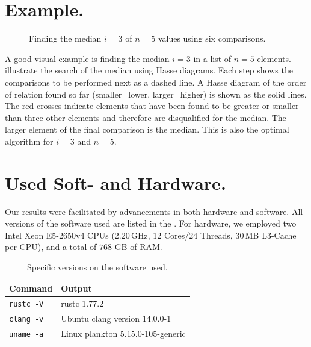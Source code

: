 \documentclass[twoside,leqno,twocolumn]{article}
\begin{document}
\section{Example.}
\begin{figure}[!b]
  \centering
  
  \caption{Finding the median $i = 3$ of $n = 5$ values using six comparisons.}
  \label{fig:median_of_5}
\end{figure}
A good visual example is finding the median $i = 3$ in a list of $n = 5$ elements.
 illustrate the search of the median using Hasse diagrams.
Each step shows the comparisons to be performed next as a dashed line.
A Hasse diagram of the order of relation found so far (smaller=lower, larger=higher) is shown as the solid lines.
The red crosses indicate elements that have been found to be greater or smaller than three other elements and therefore are disqualified for the median.
The larger element of the final comparison is the median.
This is also the optimal algorithm for $i = 3$ and $n = 5$.






\section{Used Soft- and Hardware.} \label{sec:hardware}

Our results were facilitated by advancements in both hardware and software.
All versions of the software used are listed in the .
For hardware, we employed two Intel Xeon E5-2650v4 CPUs (2.20\,GHz, 12 Cores/24 Threads, 30\,MB L3-Cache per CPU), and a total of $768$ GB of RAM.

\begin{table}[!t]
  \renewcommand{\arraystretch}{1.1}
  \caption{Specific versions on the software used.}
  \label{table:command_outputs}
  \centering
  \small
  \begin{tabular}{l|l}
    \textbf{Command}  & \textbf{Output}                   \\ \hline
    \texttt{rustc -V} & rustc 1.77.2                      \\ \hline
    \texttt{clang -v} & Ubuntu clang version 14.0.0-1     \\ \hline
    \texttt{uname -a} & Linux plankton 5.15.0-105-generic \\
  \end{tabular}
\end{table}
\end{document}
